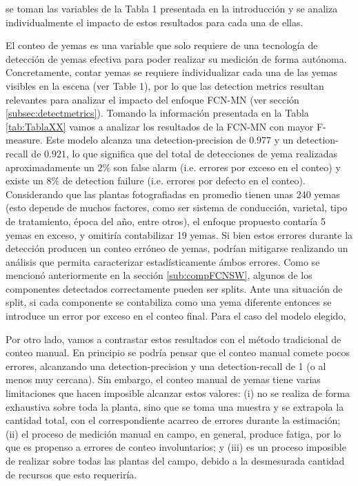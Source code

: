 \documentclass[a4paper,authoryear,review]{elsarticle}
\begin{document}
se toman las variables de la Tabla 1 presentada en la introducción y se analiza individualmente el impacto de estos resultados para cada una de ellas.



El conteo de yemas es una variable que solo requiere de una tecnología de detección de yemas efectiva para poder realizar su medición de forma autónoma. Concretamente, contar yemas se requiere individualizar cada una de las yemas visibles en la escena (ver Table 1), por lo que las detection metrics resultan relevantes para analizar el impacto del enfoque FCN-MN (ver sección \ref{subsec:detectmetrics}). 
%
Tomando la información presentada en la Tabla \ref{tab:TablaXX} vamos a analizar los resultados de la FCN-MN con mayor F-measure. Este modelo alcanza una detection-precision de $0.977$ y un detection-recall de $0.921$, lo que significa que del total de detecciones de yema realizadas aproximadamente un $2\%$ son false alarm (i.e. errores por exceso en el conteo) y existe un $8\%$ de detection failure (i.e. errores por defecto en el conteo). 
%
Considerando que las plantas fotografiadas en promedio tienen
unas 240 yemas (esto depende de muchos factores, como ser sistema de conducción, varietal, tipo de tratamiento, época del año, entre otros), el enfoque propuesto contaría 5 yemas en exceso, y omitiría contabilizar 19 yemas. Si bien estos errores durante la detección producen un conteo erróneo de yemas, podrían mitigarse realizando un análisis que permita caracterizar estadísticamente ámbos errores. 
%
Como se mencionó anteriormente en la sección \ref{sub:compFCNSW}, algunos de los componentes detectados correctamente pueden ser splits. Ante una situación de split, si cada componente se contabiliza como una yema diferente entonces se introduce un error por exceso en el conteo final. Para el caso del modelo elegido, 

Por otro lado, vamos a contrastar estos resultados con el método tradicional de conteo manual. En principio se podría pensar que el conteo manual comete pocos errores, alcanzando una detection-precision y una detection-recall de 1 (o al menos muy cercana). Sin embargo, el conteo manual de yemas tiene varias limitaciones que hacen imposible alcanzar estos valores: (i) no se realiza de forma exhaustiva sobre toda la planta, sino que se toma una muestra y se extrapola la cantidad total, con el correspondiente acarreo de errores durante la estimación; (ii) el proceso de medición manual en campo, en general, produce fatiga, por lo que es propenso a errores de conteo involuntarios; y (iii) es un proceso imposible de realizar sobre todas las plantas del campo, debido a la desmesurada cantidad de recursos que esto requeriría. 
\end{document}
